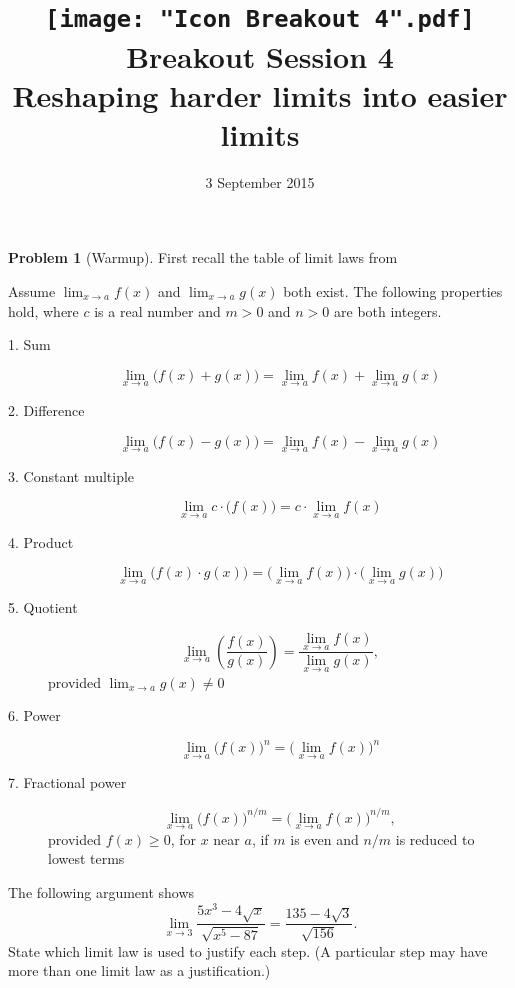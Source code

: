 \documentclass{article}
\title{\texttt{[image: "Icon Breakout 4".pdf]}\\
  Breakout Session 4\\
  Reshaping harder limits into easier limits
}
\date{3 September 2015}
\theoremstyle{definition}
\newtheorem{Problem}{Problem}
\begin{document}
\maketitle

\begin{Problem}[Warmup]
  First recall the table of limit laws from \cite[Theorem 2.3 page 70]{briggs_calculus_2015}
  \begin{Limit Laws}
    Assume $\lim_{x \to a} f(x)$ and $\lim_{x \to a} g(x)$ both exist.
    The following properties hold, where $c$ is a real number and $m > 0$ and $n > 0$ are both integers.
    \begin{description}
      \item[1. Sum]
        \[
          \lim_{x \to a} \bigl(f(x) + g(x)\bigr) = \lim_{x \to a} f(x) + \lim_{x \to a} g(x)
        \]

      \item[2. Difference]
        \[
          \lim_{x \to a} \bigl(f(x) - g(x)\bigr) = \lim_{x \to a} f(x) - \lim_{x \to a} g(x)
        \]

      \item[3. Constant multiple]
        \[
          \lim_{x \to a} c \cdot \bigl( f(x) \bigr) = c \cdot \lim_{x \to a} f(x)
        \]

      \item[4. Product]
        \[
          \lim_{x \to a} \bigl(f(x) \cdot g(x)\bigr) = \bigl(\lim_{x \to a} f(x)\bigr) \cdot \bigl(\lim_{x \to a} g(x) \bigr)
        \]

      \item[5. Quotient]
        \[
          \lim_{x \to a} \left(\frac{f(x)}{g(x)}\right) = \frac{\lim_{x \to a} f(x)}{\lim_{x \to a} g(x)},
        \]
        provided $\lim_{x \to a} g(x) \ne 0$

      \item[6. Power]
        \[
          \lim_{x \to a} \bigl(f(x)\bigr)^n = \bigl(\lim_{x \to a} f(x)\bigr)^n
        \]

      \item[7. Fractional power]
        \[
          \lim_{x \to a} \bigl(f(x)\bigr)^{n/m} = \bigl(\lim_{x \to a} f(x)\bigr)^{n/m},
        \]
        provided $f(x) \ge 0$, for $x$ near $a$, if $m$ is even and $n/m$ is reduced to lowest terms
    \end{description}

  \end{Limit Laws}
  The following argument shows 
  \[
    \lim_{x \to 3} \frac{5x^3 - 4 \sqrt{x}}{\sqrt{x^5 - 87}} = \frac{135 - 4\sqrt{3}}{\sqrt{156}}.
  \]
  State which limit law is used to justify each step.
  (A particular step may have more than one limit law as a justification.)


\end{Problem}
\end{document}

